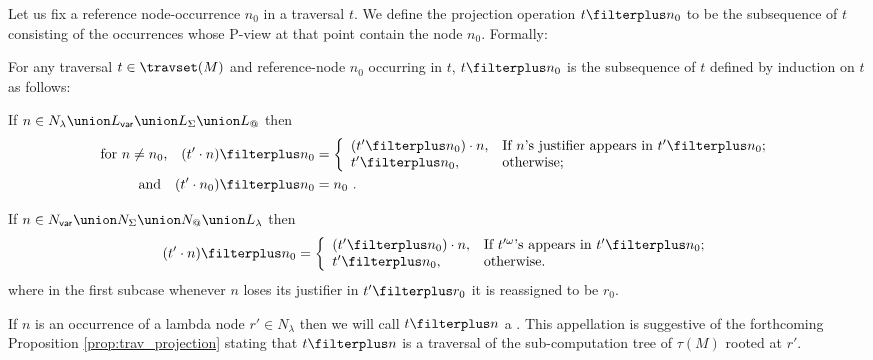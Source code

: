 Let us fix a reference node-occurrence $n_0$ in a traversal $t$.
We define the projection operation $t \filterplus n_0$ to be the subsequence of $t$ consisting of the occurrences
whose P-view at that point contain the node $n_0$. Formally:
\begin{definition}
 For any traversal $t\in \travset(M)$ and reference-node $n_0$ occurring in $t$, $t \filterplus n_0$
is the subsequence of $t$ defined by induction on $t$ as follows:
\begin{compactitem}
\item If $n\in N_\lambda \union L_{\sf var} \union L_\Sigma \union L_@$ then
\begin{align*}
\hbox{for $n\neq n_0$,}\quad (t' \cdot n) \filterplus n_0 &= \left\{
                                  \begin{array}{ll}
                                    (t'\filterplus n_0) \cdot n, & \hbox{If $n$'s justifier appears in $t'\filterplus n_0$;} \\
                                    t'\filterplus n_0, & \hbox{otherwise;}
                                  \end{array}
                                \right. \\
\hbox{and}\quad         (t' \cdot n_0) \filterplus n_0& = n_0 \ .
\end{align*}

\item If $n \in N_{\sf var} \union N_\Sigma \union N_@ \union L_\lambda$ then
$$
(t' \cdot n) \filterplus n_0 = \left\{
                                  \begin{array}{ll}
                                    (t'\filterplus n_0) \cdot n, & \hbox{If $t'^\omega$'s appears in $t'\filterplus n_0$;} \\
                                    t'\filterplus n_0, & \hbox{otherwise.}
                                  \end{array}
                                \right.
$$
where in the first subcase whenever $n$ loses its justifier in
$t'\filterplus r_0$ it is reassigned to be $r_0$.
\end{compactitem}
\end{definition}

If $n$ is an occurrence of a lambda node $r' \in N_\lambda$ then we
will call $t \filterplus n$ a . This appellation is suggestive of the
forthcoming Proposition \ref{prop:trav_projection} stating that $t
\filterplus n$ is a traversal of the sub-computation tree of
$\tau(M)$ rooted at $r'$.
\bigskip


